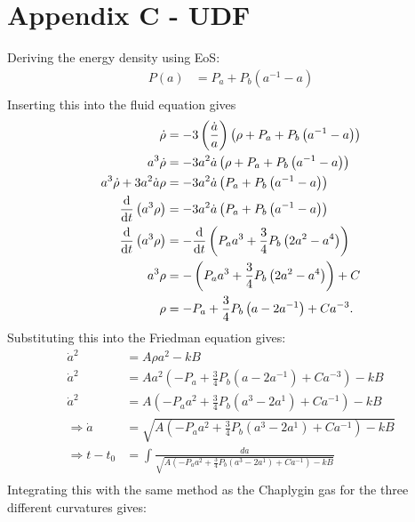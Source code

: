 \documentclass[a4paper, 11pt]{FSKH_623_Report}
\numberwithin{equation}{section}
\newcommand{\brac}[1]{\left(#1\right)}
\begin{document}
\section*{Appendix C - UDF}
Deriving the energy density using EoS:
\begin{equation}\label{eq:UDFEoS}
\begin{split}
P(a) &= P_{a}+P_{b}\brac{a^{-1}-a}        \\
\end{split}
\end{equation}
Inserting this into the fluid equation gives
\begin{equation}\label{eq:UDFED}
\begin{split}
\dot{\rho} &= -3\brac{\frac{\dot{a}}{a}}\brac{\rho+P_{a}+P_{b}\brac{a^{-1}-a}} \\
a^{3}\dot{\rho} &= -3a^{2}\dot{a}\brac{\rho+P_{a}+P_{b}\brac{a^{-1}-a}} \\
a^{3}\dot{\rho}+3a^{2}\dot{a}\rho &= -3a^{2}\dot{a}\brac{P_{a}+P_{b}\brac{a^{-1}-a}} \\
\dv{t}\brac{a^{3}\rho}&= -3a^{2}\dot{a}\brac{P_{a}+P_{b}\brac{a^{-1}-a}} \\
\dv{t}\brac{a^{3}\rho}&= -\dv{t}\brac{P_{a}a^{3}+\frac{3}{4}P_{b}\brac{2a^{2}-a^{4}}} \\
a^{3}\rho&= -\brac{P_{a}a^{3}+\frac{3}{4}P_{b}\brac{2a^{2}-a^{4}}}+C \\
\rho&= -P_{a}+\frac{3}{4}P_{b}\brac{a-2a^{-1}}+Ca^{-3}. \\
\end{split}
\end{equation}
Substituting this into the Friedman equation gives:
\begin{equation}\label{eq:UDFFEQ}
\begin{split}
\dot{a}^{2} &= A\rho a^{2}-kB        \\
\dot{a}^{2} &= Aa^{2}\brac{-P_{a}+\frac{3}{4}P_{b}\brac{a-2a^{-1}}+Ca^{-3}}-kB\\
\dot{a}^{2} &= A\brac{-P_{a}a^{2}+\frac{3}{4}P_{b}\brac{a^{3}-2a^{1}}+Ca^{-1}}-kB\\
\Rightarrow \dot{a} &= \sqrt{A\brac{-P_{a}a^{2}+\frac{3}{4}P_{b}\brac{a^{3}-2a^{1}}+Ca^{-1}}-kB} \\
\Rightarrow t-t_{0} &= \int \frac{da}{\sqrt{A\brac{-P_{a}a^{2}+\frac{3}{4}P_{b}\brac{a^{3}-2a^{1}}+Ca^{-1}}-kB}} \\
\end{split}
\end{equation}
Integrating this with the same method as the Chaplygin gas for the three different curvatures gives:
\end{document}
